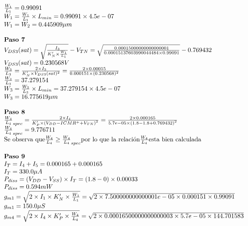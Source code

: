 \begin{equation}
\begin{array}{l l}
		\frac{W_1}{L_1} =  0.99091  \\
		W_{1} = \frac{W_1}{L_1} \times L_{min} =  0.99091 \times 4.5e-07  \\
		W_{1} = W_{2} =  0.445909  \mu m \\
		\\
		\textbf{Paso 7} \\
		V_{DS3}(sat) = \sqrt{\frac{I_{3}}{K'_{N} \times \frac{W_1}{L_1}}} - V_{TN} = \sqrt{\frac{ 0.00015000000000000001 }{ 0.00015137603990044484  \times  0.99091 }} -  0.769432  \\
		V_{DS3}(sat) =  0.230568  V \\
		\frac{W_3}{L_3} = \frac{2\times I_{3}}{K'_{N} \times V_{DS3}(sat)^2} = \frac{2\times 0.00015 }{ 0.000151 \times ( 0.230568 )^2} \\
		\frac{W_3}{L_3} =  37.279154  \\
		W_{3} = \frac{W_3}{L_3} \times L_{min} =  37.279154 \times 4.5e-07  \\
		W_{3}  =  16.775619  \mu m \\
		\\
		\textbf{Paso 8} \\
		\frac{W_4}{L_4}_{spec} = \frac{2\times I_{4}}{K'_{P} \times \left( V_{DD} - ICMR^{+} + V_{TN} \right) ^2} = \frac{2 \times  0.000165 }{ 5.7e-05  \times \left(  1.8  -  1.8  +  0.769432  \right) ^2} \\
		\frac{W_4}{L_4}_{spec} =  9.776711  \\
		\text{Se observa que} \frac{W_4}{L_4} \geq \frac{W_4}{L_4}_{spec} \text{por lo que la relación} \frac{W_4}{L_4} \text{esta bien calculada} \\
		\\
		\textbf{Paso 9} \\
		I_{T} = I_{4} + I_{5} =  0.000165 + 0.000165  \\
		I_{T} =  330.0  \mu A \\
		P_{diss} = (V_{DD} - V_{SS}) \times I_{T} = ( 1.8 - 0 ) \times  0.00033  \\
		P_{diss} =  0.594  mW \\
		g_{m1} = \sqrt{2 \times I_{1} \times K'_{N} \times \frac{W_1}{L_1}} = \sqrt{2 \times  7.500000000000001e-05  \times  0.000151  \times  0.99091 } \\
		g_{m1} =  150.0  \mu S \\
		g_{m4} = \sqrt{2 \times I_{4} \times K'_{P} \times \frac{W_4}{L_4}} = \sqrt{2 \times  0.00016500000000000003  \times  5.7e-05  \times  144.701583 } \\

\end{array}
\end{equation}
